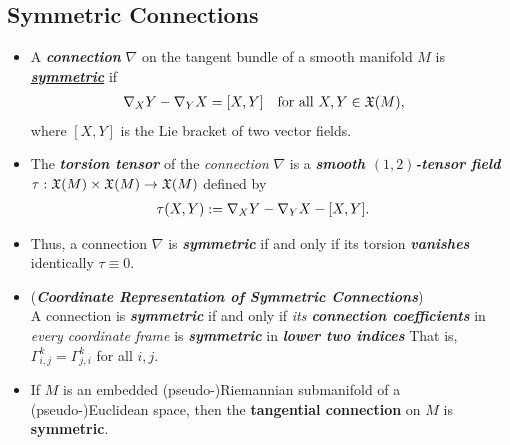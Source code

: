 \documentclass[11pt]{article}
\begin{document}
\subsection{Symmetric Connections}
\begin{itemize}
\item \begin{definition}
A \emph{\textbf{connection}} $\nabla$ on the tangent bundle of a smooth manifold $M$ is \underline{\emph{\textbf{symmetric}}} if
\begin{align*}
\nabla_{X}{Y} - \nabla_{Y}{X} &= [X, Y]  \quad \text{for all }X,Y \in {\mathfrak X}(M),
\end{align*} where $[X, Y]$ is the Lie bracket of two vector fields.
\end{definition}

\item \begin{definition}
The \emph{\textbf{torsion tensor}} of the \emph{connection} $\nabla$ is a \emph{\textbf{smooth $(1,2)$-tensor field}} $\tau: {\mathfrak X}(M) \times {\mathfrak X}(M) \rightarrow {\mathfrak X}(M)$ defined by
\begin{align*}
\tau(X, Y) &:= \nabla_{X}{Y} - \nabla_{Y}{X} - [X, Y].
\end{align*}
\end{definition}

\item \begin{remark}
Thus, a connection $\nabla$ is \emph{\textbf{symmetric}} if and only if its torsion \emph{\textbf{vanishes}} identically $\tau \equiv 0$.
\end{remark}

\item \begin{remark} (\emph{\textbf{Coordinate Representation of Symmetric Connections}})\\
A connection is \emph{\textbf{symmetric}} if and only if \emph{its \textbf{connection coefficients}} in \emph{every coordinate frame} is \emph{\textbf{symmetric}} in \emph{\textbf{lower two indices}} That is, \underline{$\Gamma_{i,j}^{k} = \Gamma_{j,i}^{k}$} for all $i,j$. 
\end{remark}

\item \begin{proposition}
If $M$ is an embedded (pseudo-)Riemannian submanifold of a (pseudo-)Euclidean space, then the \textbf{tangential connection} on $M$ is \textbf{symmetric}.
\end{proposition}
\end{itemize}
\end{document}
